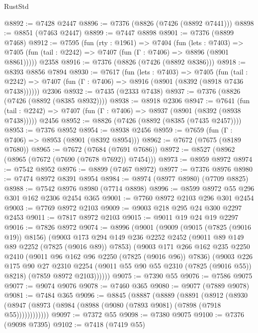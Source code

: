 \begin{lexlean}{RustStd}
\begin{coremodule}
@8892 := @7428 @2447
@8896 := @7376 (@8826 (@7426 (@8892 @7441)))
@8898 := @8851 (@7463 @2447)
@8899 := @7447 @8898
@8901 := @7376 (@8899 @7468)
@8912 := @7595
    (fun (rty : @1961) =>
    @7404
      (fun (lets : @7403) =>
      @7405 (fun (tail : @2242) => @7407 (fun (Γ : @7406) => @8896 (@8901 @8861)))))
    @2358
@8916 := @7376 (@8826 (@7426 (@8892 @8386)))
@8918 := @8393 @8856 @7894
@8930 := @7617
    (fun (lets : @7403) =>
    @7405
      (fun (tail : @2242) => @7407 (fun (Γ : @7406) => @8916 (@8901 (@8392 (@8918 @7436 @7438))))))
    @2306
@8932 := @7435 (@2333 @7438)
@8937 := @7376 (@8826 (@7426 (@8892 (@8385 @8932))))
@8938 := @8918 @2306
@8947 := @7641
    (fun (tail : @2242) => @7407 (fun (Γ : @7406) => @8937 (@8901 (@8392 (@8938 @7438)))))
    @2456
@8952 := @8826 (@7426 (@8892 (@8385 (@7435 @2457))))
@8953 := @7376 @8952
@8954 := @8938 @2456
@8959 := @7659 (fun (Γ : @7406) => @8953 (@8901 (@8392 @8954)))
@8962 := @7672 (@7675 (@8189 @7680))
@8965 := @7672 (@7684 (@7691 @7686))
@8972 := @8527 (@8962 (@8965 (@7672 (@7690 (@7678 @7692)) @7454)))
@8973 := @8959 @8972
@8974 := @7542 @8952
@8976 := @8899 (@7467 @8972)
@8977 := @7376 @8976
@8980 := @7474 @8972 @8391 @8954
@8984 := @8974 (@8977 @8980) (@7709 @8825)
@8988 := @7542 @8976 @8980 (@7714 @8898)
@8996 := @8599 @8972 @55 @296 @301 @162 @2306 @2454 @365
@9001 := @7760 @8972 @2103 @296 @301 @2454
@9003 := @7769 @8972 @2103
@9009 := @9003 @218 @295 @24 @300 @2297 @2453
@9011 := @7817 @8972 @2103
@9015 := @9011 @19 @24 @19 @2297
@9016 := @7826 @8972
@9074 := @8996
    (@9001
      (@9009
        (@9015 (@7825 (@9016 @19)) @8156)
        (@9003
          @173
          @294
          @149
          @236
          @2252
          @2452
          (@9011 @89 @149 @89 @2252 (@7825 (@9016 @89)) @7853)
          (@9003
            @171
            @266
            @162
            @235
            @2250
            @2410
            (@9011 @96 @162 @96 @2250 (@7825 (@9016 @96)) @7836)
            (@9003
              @226
              @175
              @90
              @27
              @2310
              @2254
              (@9011 @55 @90 @55 @2310 (@7825 (@9016 @55)) @8218)
              (@7859 @8972 @2103))))))
@9075 := @7390 @55
@9076 := @7586 @9075
@9077 := @9074 @9076
@9078 := @7460 @365
@9080 := @9077 (@7889 @9078)
@9081 := @7484 @365
@9096 := @8845
    (@8887
      (@8889
        (@8891
          (@8912
            (@8930 (@8947 (@8973 (@8984 (@8988 (@9080 (@7893 @9081) (@7898 (@7918 @55))))))))))))
@9097 := @7372 @55
@9098 := @7380 @9075
@9100 := @7376 (@9098 @7395)
@9102 := @7418 (@7419 @55)

\end{coremodule}
\end{lexlean}
